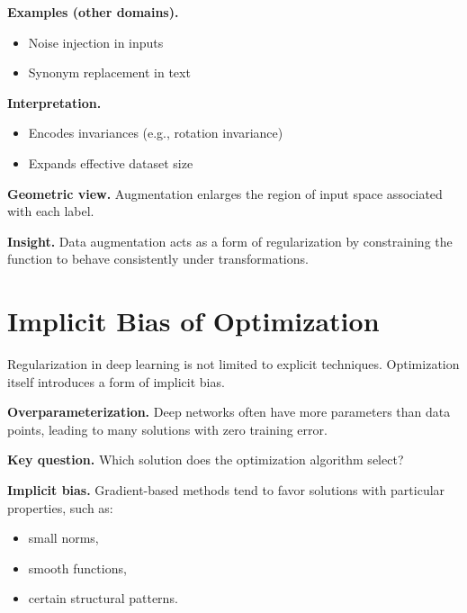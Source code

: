 \medskip

\noindent
\textbf{Examples (other domains).}
\begin{itemize}
    \item Noise injection in inputs
    \item Synonym replacement in text
\end{itemize}

\medskip

\noindent
\textbf{Interpretation.}
\begin{itemize}
    \item Encodes invariances (e.g., rotation invariance)
    \item Expands effective dataset size
\end{itemize}

\medskip

\noindent
\textbf{Geometric view.}  
Augmentation enlarges the region of input space associated with each label.

\medskip

\noindent
\textbf{Insight.}  
Data augmentation acts as a form of regularization by constraining the function to behave consistently under transformations.

\section{Implicit Bias of Optimization}

Regularization in deep learning is not limited to explicit techniques. Optimization itself introduces a form of implicit bias.

\medskip

\noindent
\textbf{Overparameterization.}  
Deep networks often have more parameters than data points, leading to many solutions with zero training error.

\medskip

\noindent
\textbf{Key question.}  
Which solution does the optimization algorithm select?

\medskip

\noindent
\textbf{Implicit bias.}  
Gradient-based methods tend to favor solutions with particular properties, such as:
\begin{itemize}
    \item small norms,
    \item smooth functions,
    \item certain structural patterns.
\end{itemize}


